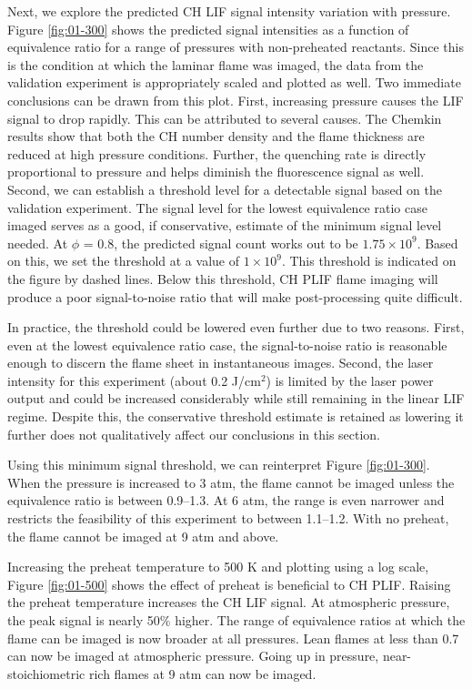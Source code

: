 Next, we explore the predicted CH LIF signal intensity variation with pressure.
Figure \ref{fig:01-300} shows the predicted signal intensities as a function of equivalence ratio for a range of pressures with non-preheated reactants.
Since this is the condition at which the laminar flame was imaged, the data from the validation experiment is appropriately scaled and plotted as well.
Two immediate conclusions can be drawn from this plot.
First, increasing pressure causes the LIF signal to drop rapidly.
This can be attributed to several causes.
The Chemkin results show that both the CH number density and the flame thickness are reduced at high pressure conditions.
Further, the quenching rate is directly proportional to pressure and helps diminish the fluorescence signal as well.
Second, we can establish a threshold level for a detectable signal based on the validation experiment.
The signal level for the lowest equivalence ratio case imaged serves as a good, if conservative, estimate of the minimum signal level needed.
At \(\phi\) = 0.8, the predicted signal count works out to be \(1.75\times10^9\).
Based on this, we set the threshold at a value of \(1\times10^9\).
This threshold is indicated on the figure by dashed lines.
Below this threshold, CH PLIF flame imaging will produce a poor signal-to-noise ratio that will make post-processing quite difficult.

In practice, the threshold could be lowered even further due to two reasons.
First, even at the lowest equivalence ratio case, the signal-to-noise ratio is reasonable enough to discern the flame sheet in instantaneous images.
Second, the laser intensity for this experiment (about 0.2 J/cm\(^2\)) is limited by the laser power output and could be increased considerably while still remaining in the linear LIF regime.
Despite this, the conservative threshold estimate is retained as lowering it further does not qualitatively affect our conclusions in this section.

Using this minimum signal threshold, we can reinterpret Figure \ref{fig:01-300}.
When the pressure is increased to 3 atm, the flame cannot be imaged unless the equivalence ratio is between 0.9--1.3.
At 6 atm, the range is even narrower and restricts the feasibility of this experiment to between 1.1--1.2.
With no preheat, the flame cannot be imaged at 9 atm and above.



Increasing the preheat temperature to 500 K and plotting using a log scale, Figure \ref{fig:01-500} shows the effect of preheat is beneficial to CH PLIF.
Raising the preheat temperature increases the CH LIF signal.
At atmospheric pressure, the peak signal is nearly 50\% higher.
The range of equivalence ratios at which the flame can be imaged is now broader at all pressures.
Lean flames at less than 0.7 can now be imaged at atmospheric pressure.
Going up in pressure, near-stoichiometric rich flames at 9 atm can now be imaged.

